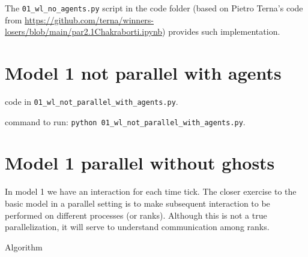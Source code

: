 \documentclass{article}
\begin{document}
The \verb+01_wl_no_agents.py+ script in the code folder (based on Pietro Terna's code from
\url{https://github.com/terna/winners-losers/blob/main/par2.1Chakraborti.ipynb}) provides such implementation.

\section{Model 1 not parallel with agents}

code in \verb+01_wl_not_parallel_with_agents.py+.

command to run: \verb+python 01_wl_not_parallel_with_agents.py+.

\section{Model 1 parallel without ghosts}



In model 1 we have an interaction for each time tick. The
closer exercise to the basic model in a parallel setting is to make subsequent interaction
to be performed on different processes (or ranks). Although this is not
a true parallelization, it will serve to understand communication among
ranks.

Algorithm
\end{document}
